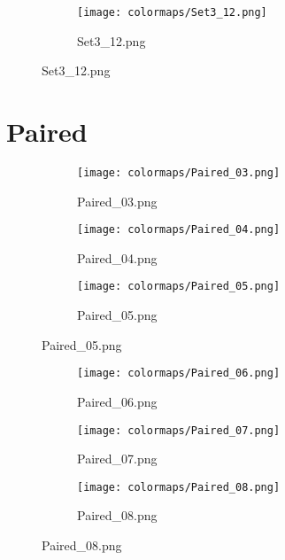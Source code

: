 \documentclass{article}%
\begin{document}
%
\hspace{1cm}\hfill%


\begin{figure}[h!]%
\begin{subfigure}[b]{0.3\linewidth}%
\texttt{[image: colormaps/Set3\_12.png]}%
\caption{Set3\_12.png}%
\end{subfigure}%
\end{figure}

%
\newpage%
\section{Paired}%
\label{sec:Paired}%
\hspace{1cm}\hfill%
\hspace{1cm}\hfill%
\hspace{1cm}\hfill%


\begin{figure}[h!]%
\begin{subfigure}[b]{0.3\linewidth}%
\texttt{[image: colormaps/Paired\_03.png]}%
\caption{Paired\_03.png}%
\end{subfigure}%
\begin{subfigure}[b]{0.3\linewidth}%
\texttt{[image: colormaps/Paired\_04.png]}%
\caption{Paired\_04.png}%
\end{subfigure}%
\begin{subfigure}[b]{0.3\linewidth}%
\texttt{[image: colormaps/Paired\_05.png]}%
\caption{Paired\_05.png}%
\end{subfigure}%
\end{figure}

%
\hspace{1cm}\hfill%
\hspace{1cm}\hfill%
\hspace{1cm}\hfill%


\begin{figure}[h!]%
\begin{subfigure}[b]{0.3\linewidth}%
\texttt{[image: colormaps/Paired\_06.png]}%
\caption{Paired\_06.png}%
\end{subfigure}%
\begin{subfigure}[b]{0.3\linewidth}%
\texttt{[image: colormaps/Paired\_07.png]}%
\caption{Paired\_07.png}%
\end{subfigure}%
\begin{subfigure}[b]{0.3\linewidth}%
\texttt{[image: colormaps/Paired\_08.png]}%
\caption{Paired\_08.png}%
\end{subfigure}%
\end{figure}
\end{document}
